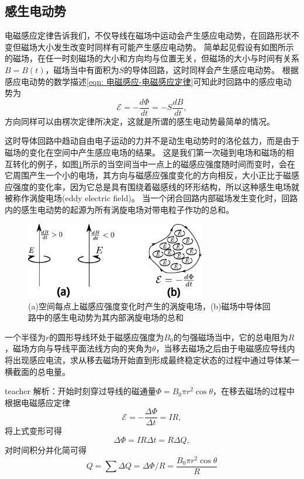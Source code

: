 \subsection{感生电动势}
电磁感应定律告诉我们，不仅导线在磁场中运动会产生感应电动势，在回路形状不变但磁场大小发生改变时同样有可能产生感应电动势。
简单起见假设有如图所示的磁场，在任一时刻磁场的大小和方向均与位置无关，但磁场的大小与时间有关系$B=B(t)$，磁场当中有面积为$S$的导体回路，这时同样会产生感应电动势。
根据感应电动势的数学描述\ref{eqn: 电磁感应-电磁感应定律}可知此时回路中的感应电动势为
\begin{equation}
\mathcal{E} = -\frac{d\Phi}{dt} = -S\frac{dB}{dt},
\end{equation}
方向同样可以由楞次定律所决定，这就是所谓的{\heiti 感生电动势}最简单的情况。

这时导体回路中趋动自由电子运动的力并不是动生电动势时的洛伦兹力，而是由于磁场的变化在空间中产生感应电场的结果。
这是我们第一次碰到电场和磁场的相互转化的例子，如图\ref{fig: 涡旋电场}所示的当空间当中一点上的磁感应强度随时间而变时，会在它周围产生一个小的电场，其方向与磁感应强度变化的方向相反，大小正比于磁感应强度的变化率，因为它总是具有围绕着磁感线的环形结构，所以这种感生电场就被称作{\heiti 涡旋电场}(eddy electric field)。
当一个闭合回路内部磁场发生变化时，回路内的感生电动势的起源为所有涡旋电场对带电粒子作功的总和。
\begin{figure}[hbtp]
\centering
\includegraphics[width=0.7\textwidth]{images/mag-2.pdf}
\caption{(a)空间每点上磁感应强度变化时产生的涡旋电场，(b)磁场中导体回路中的感生电动势为其内部涡旋电场的总和}\label{fig: 涡旋电场}
\end{figure}



\begin{example}
一个半径为$r$的圆形导线环处于磁感应强度为$B_0$的匀强磁场当中，它的总电阻为$R$，磁场方向与导线平面法线方向的夹角为$\theta$，当移去磁场之后由于电磁感应导线内将出现感应电流，求从移去磁场开始直到形成最终稳定状态的过程中通过导体某一横截面的总电量。
\begin{taggedblock}{teacher}
\newline
解析：开始时刻穿过导线的磁通量$\Phi = B_0\pi r^2\cos\theta$，在移去磁场的过程中根据电磁感应定律
\[
\mathcal{E} = -\frac{\Delta \Phi}{\Delta t} = IR,
\]
将上式变形可得
\[
\Delta \Phi = IR\Delta t = R\Delta Q,
\]
对时间积分并化简可得
\[
Q = \sum \Delta Q = \Delta \Phi/R = \frac{B_0\pi r^2\cos\theta}{R}
\]
\end{taggedblock}
\end{example}





